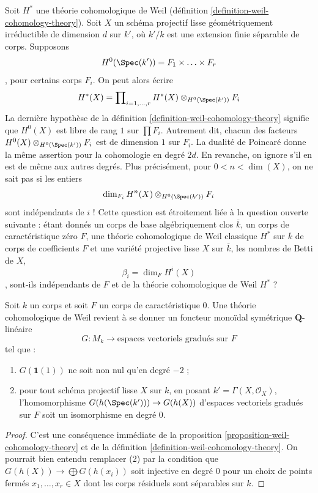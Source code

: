 \begin{remark}
\label{remark-betti-numbers-in-some-sense}
Soit $H^*$ une théorie cohomologique de Weil
(définition \ref{definition-weil-cohomology-theory}).
Soit $X$ un schéma projectif lisse géométriquement irréductible
de dimension $d$ sur $k'$, où $k'/k$ est une extension finie séparable de corps.
Supposons
$$
H^0(\Spec(k')) = F_1 \times \ldots \times F_r
$$,
pour certains corps $F_i$. On peut alors écrire
$$
H^*(X) = \prod\nolimits_{i = 1, \ldots, r}
H^*(X) \otimes_{H^0(\Spec(k'))} F_i
$$
La dernière hypothèse de la définition \ref{definition-weil-cohomology-theory}
signifie que $H^0(X)$ est libre de rang $1$ sur $\prod F_i$.
Autrement dit, chacun des facteurs
$H^0(X) \otimes_{H^0(\Spec(k'))} F_i$ est de dimension $1$ sur $F_i$.
La dualité de Poincar\'e donne la même assertion pour
la cohomologie en degré $2d$.
En revanche, on ignore s'il en est de même aux autres degrés.
Plus précisément, pour $0 < n < \dim(X)$, on ne sait pas si les entiers
$$
\dim_{F_i} H^n(X) \otimes_{H^0(\Spec(k'))} F_i
$$
sont indépendants de $i$ ! Cette question est étroitement liée à la question
ouverte suivante : étant donnés un corps de base algébriquement clos $\overline{k}$,
un corps de caractéristique zéro $F$, une théorie cohomologique de Weil classique
$H^*$ sur $\overline{k}$ de corps de coefficients $F$ et une variété projective lisse
$X$ sur $\overline{k}$, les nombres de Betti de $X$,
$$
\beta_i = \dim_F H^i(X)
$$,
sont-ils indépendants de $F$ et de la théorie cohomologique de Weil $H^*$ ?
\end{remark}

\begin{proposition}
\label{proposition-weil-cohomology-theory-again}
Soit $k$ un corps et soit $F$ un corps de caractéristique $0$.
Une théorie cohomologique de Weil revient à se donner un foncteur
monoïdal symétrique $\mathbf{Q}$-linéaire
$$
G : M_k \longrightarrow \text{espaces vectoriels gradués sur }F\text{}
$$
tel que :
\begin{enumerate}
\item $G(\mathbf{1}(1))$ ne soit non nul qu'en degré $-2$ ;
\item pour tout schéma projectif lisse $X$ sur $k$, en posant
$k' = \Gamma(X, \mathcal{O}_X)$, l'homomorphisme
$G(h(\Spec(k'))) \to G(h(X))$ d'espaces vectoriels gradués sur $F$
soit un isomorphisme en degré $0$.
\end{enumerate}
\end{proposition}

\begin{proof}
C'est une conséquence immédiate de la proposition \ref{proposition-weil-cohomology-theory}
et de la définition \ref{definition-weil-cohomology-theory}. On pourrait bien entendu
remplacer (2) par la condition que $G(h(X)) \to \bigoplus G(h(x_i))$
soit injective en degré $0$ pour un choix de points fermés
$x_1, \ldots, x_r \in X$ dont les corps résiduels sont séparables sur $k$.
\end{proof}








